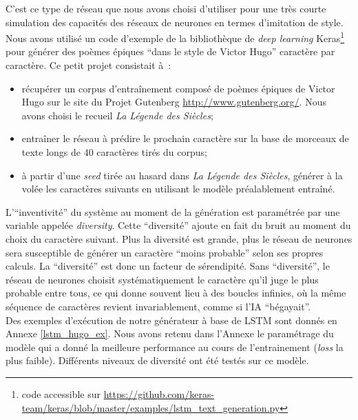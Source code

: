 \documentclass{article}
\begin{document}
					C'est ce type de réseau que nous avons choisi d'utiliser pour une très courte simulation des capacités des réseaux de neurones en termes d'imitation de style. Nous avons utilisé un code d'exemple de la bibliothèque de \textit{deep learning} Keras\footnote{code accessible sur \href{https://github.com/keras-team/keras/blob/master/examples/lstm_text_generation.py}{https://github.com/keras-team/keras/blob/master/examples/lstm\_text\_generation.py}} pour générer des poèmes épiques ``dans le style de Victor Hugo'' caractère par caractère. Ce petit projet consistait à~:
					\vspace{2mm}
					\begin{itemize}
						\item récupérer un corpus d'entraînement composé de poèmes épiques de Victor Hugo sur le site du Projet Gutenberg \href{http://www.gutenberg.org/}{http://www.gutenberg.org/}. Nous avons choisi le recueil \textit{La Légende des Siècles};
						\item entraîner le réseau à prédire le prochain caractère sur la base de morceaux de texte longs de $40$ caractères tirés du corpus;
						\item à partir d'une \textit{seed} tirée au hasard dans \textit{La Légende des Siècles}, générer à la volée les caractères suivants en utilisant le modèle préalablement entraîné.
					\end{itemize}
					\vspace{2mm}
					L'``inventivité'' du système au moment de la génération est paramétrée par une variable appelée \textit{diversity}. Cette ``diversité'' ajoute en fait du bruit au moment du choix du caractère suivant. Plus la diversité est grande, plus le réseau de neurones sera susceptible de générer un caractère ``moins probable'' selon ses propres calculs. La ``diversité'' est donc un facteur de sérendipité. Sans ``diversité'', le réseau de neurones choisit systématiquement le caractère qu'il juge le plus probable entre tous, ce qui donne souvent lieu à des boucles infinies, où la même séquence de caractères revient invariablement, comme si l'IA ``bégayait''.\\
					
					Des exemples d'exécution de notre générateur à base de LSTM sont donnés en Annexe \ref{lstm_hugo_ex}. Nous avons retenu dans l'Annexe le paramétrage du modèle qui a donné la meilleure performance  au cours de l'entrainement (\textit{loss} la plus faible). Différents niveaux de diversité ont été testés sur ce modèle.\\
					
\end{document}
